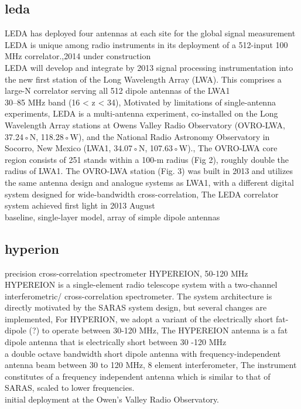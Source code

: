 \documentclass[12pt, TexShade, letterpaper]{report}
\begin{document}
\subsection{\gls{leda}}
LEDA has deployed four antennas at each site for the global signal measurement \cite{leda_foreground}\\
LEDA is unique among radio instruments in its deployment of a 512-input 100 MHz correlator.,2014 under construction \cite{leda_1}\\
LEDA will develop and integrate by 2013 signal processing instrumentation into the new first station of the Long Wavelength Array (LWA). This comprises a large-N correlator serving all 512 dipole antennas of the LWA1 \cite{leda_2}\\
30–85 MHz band (16 < z < 34), Motivated by limitations of single-antenna experiments, LEDA is a multi-antenna experiment, co-installed on the Long Wavelength Array stations at Owens Valley Radio Observatory (OVRO-LWA, 37.24◦N, 118.28◦W), and the National Radio Astronomy Observatory in Socorro, New Mexico (LWA1, 34.07◦N, 107.63◦W)., The OVRO-LWA core region consists of 251 stands within a 100-m radius (Fig 2), roughly double the radius of LWA1. The OVRO-LWA station (Fig. 3) was built in 2013 and utilizes the same antenna design and analogue systems as LWA1, with a different digital system designed for wide-bandwidth cross-correlation, The LEDA correlator system achieved first light in 2013 August \cite{leda_design}\\
baseline, single-layer model, array of simple dipole antennas\cite{leda_beam}

\subsection{\gls{hyperion}}
precision cross-correlation spectrometer HYPEREION, 50-120 MHz
HYPEREION is a single-element radio telescope system with a two-channel interferometric/ cross-correlation spectrometer. The system architecture is directly motivated by the SARAS system design, but several changes are implemented, For HYPERION, we adopt a variant of the electrically short fat-dipole (?) to operate between 30-120 MHz, The HYPEREION antenna is a fat dipole antenna that is electrically short between 30 -120 MHz \cite{hyperion_1}\\
a double octave bandwidth short dipole antenna with frequency-independent antenna beam between 30 to 120 MHz, 8 element interferometer, The instrument constitutes of a frequency independent antenna which is similar to that of SARAS, scaled to lower frequencies. \cite{hyperion_2}\\
initial deployment at the Owen’s Valley Radio Observatory. \cite{hyperion_3}
\end{document}
